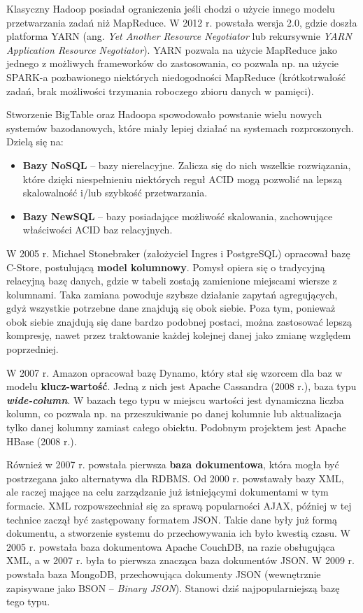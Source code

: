 \documentclass[12pt,a4paper,twoside,titlepage,openright]{book}
\begin{document}
Klasyczny Hadoop posiadał ograniczenia jeśli chodzi o użycie innego modelu przetwarzania zadań niż MapReduce. W 2012 r. powstała wersja 2.0, gdzie doszła platforma YARN (ang. \textit{Yet Another Resource Negotiator} lub rekursywnie \textit{YARN Application Resource Negotiator}). YARN pozwala na użycie MapReduce jako jednego z możliwych frameworków do zastosowania, co pozwala np. na użycie SPARK-a pozbawionego niektórych niedogodności MapReduce (krótkotrwałość zadań, brak możliwości trzymania roboczego zbioru danych w pamięci). \cite{hadoop, bigData}

Stworzenie BigTable oraz Hadoopa spowodowało powstanie wielu nowych systemów bazodanowych, które miały lepiej działać na systemach rozproszonych. Dzielą się na:
\begin{itemize}
\item \textbf{Bazy NoSQL} -- bazy nierelacyjne. Zalicza się do nich wszelkie rozwiązania, które dzięki niespełnieniu niektórych reguł ACID mogą pozwolić na lepszą skalowalność i/lub szybkość przetwarzania.
\item \textbf{Bazy NewSQL} -- bazy posiadające możliwość skalowania, zachowujące właściwości ACID baz relacyjnych.
\end{itemize}

W 2005 r. Michael Stonebraker (założyciel Ingres i PostgreSQL) opracował bazę C-Store, postulującą \textbf{model kolumnowy}. Pomysł opiera się o tradycyjną relacyjną bazę danych, gdzie w tabeli zostają zamienione miejscami wiersze z kolumnami. Taka zamiana powoduje szybsze działanie zapytań agregujących, gdyż wszystkie potrzebne dane znajdują się obok siebie. Poza tym, ponieważ obok siebie znajdują się dane bardzo podobnej postaci, można zastosować lepszą kompresję, nawet przez traktowanie każdej kolejnej danej jako zmianę względem poprzedniej.

W 2007 r. Amazon opracował bazę Dynamo, który stał się wzorcem dla baz w modelu \textbf{klucz-wartość}. Jedną z nich jest Apache Cassandra (2008 r.), baza typu \textit{\textbf{wide-column}}. W bazach tego typu w miejscu wartości jest dynamiczna liczba kolumn, co pozwala np. na przeszukiwanie po danej kolumnie lub aktualizacja tylko danej kolumny zamiast całego obiektu. Podobnym projektem jest Apache HBase (2008 r.).

Również w 2007 r. powstała pierwsza \textbf{baza dokumentowa}, która mogła być postrzegana jako alternatywa dla RDBMS. Od 2000 r. powstawały bazy XML, ale raczej mające na celu zarządzanie już istniejącymi dokumentami w tym formacie. XML rozpowszechniał się za sprawą popularności AJAX, później w tej technice zaczął być zastępowany formatem JSON. Takie dane były już formą dokumentu, a stworzenie systemu do przechowywania ich było kwestią czasu. W 2005 r. powstała baza dokumentowa Apache CouchDB, na razie obsługująca XML, a w 2007 r. była to pierwsza znacząca baza dokumentów JSON. W 2009 r. powstała baza MongoDB, przechowująca dokumenty JSON (wewnętrznie zapisywane jako BSON -- \textit{Binary JSON}). Stanowi dziś najpopularniejszą bazę tego typu.
\end{document}
